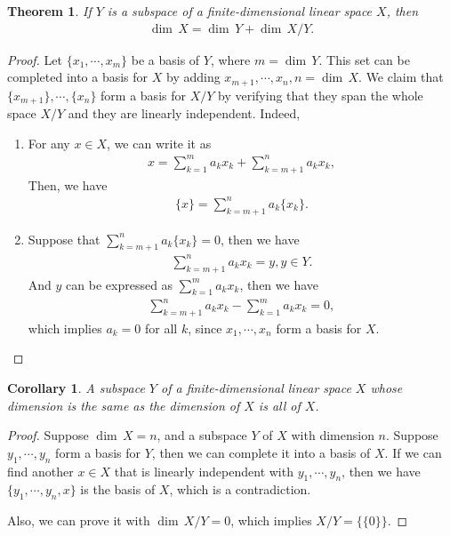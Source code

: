 \documentclass[11pt]{book}
\newtheorem{theorem}{Theorem}[chapter]
\newtheorem{corollary}{Corollary}[theorem]
\theoremstyle{definition}
\numberwithin{equation}{chapter}
\begin{document}
\medskip

\begin{theorem}\label{theorem_quotient_dim}
If $Y$ is a subspace of a finite-dimensional linear space $X$, then
\begin{align*}
     \dim \,X =  \dim \,Y +  \dim \,X/Y.
\end{align*}
\end{theorem}
\begin{proof}
Let $\{x_1, \cdots, x_m\}$ be a basis of $Y$, where $m =  \dim \,Y$. This set can be completed into a basis for $X$ by adding $x_{m+1}, \cdots, x_n, n =  \dim \,X$. We claim that $\{x_{m+1}\}, \cdots, \{x_n\}$ form a basis for $X/Y$ by  verifying that they span the whole space $X/Y$ and they are linearly independent. Indeed,
\begin{enumerate}[label=(\alph*)]
    \item For any $x\in X$, we can write it as 
    \begin{align*}
        x = \sum^m_{k=1}a_k x_k + \sum^{n}_{k=m+1}a_k x_k,
    \end{align*}
    Then, we have 
    \begin{align*}
        \{x\} = \sum^{n}_{k=m+1}a_k \{x_k\}.
    \end{align*}
    \item Suppose that $\sum^{n}_{k=m+1}a_k \{x_k\} = 0$, then we have 
    \begin{align*}
        \sum^{n}_{k=m+1}a_k x_k = y, y\in Y.
    \end{align*}
    And $y$ can be expressed as $\sum^{m}_{k=1}a_k x_k$, then we have 
    \begin{align*}
        \sum^{n}_{k=m+1}a_k x_k - \sum^{m}_{k=1}a_k x_k = 0,
    \end{align*}
    which implies $a_k = 0$ for all $k$, since $x_1, \cdots, x_n$ form a basis for $X$.
\end{enumerate}
\end{proof}


\begin{corollary}
A subspace $Y$ of a finite-dimensional linear space $X$ whose dimension is the same as the dimension of $X$ is all of $X$.
\end{corollary}
\begin{proof}
Suppose $ \dim \,X = n$, and a subspace $Y$ of $X$ with dimension $n$. Suppose $y_1,\cdots,y_n$ form a basis for $Y$, then we can complete it into a basis of $X$. If we can find another $x\in X$ that is linearly independent with $y_1,\cdots,y_n$, then we have $\{y_1,\cdots,y_n, x\}$ is the basis of $X$, which is a contradiction. 

Also, we can prove it with $ \dim \,X/Y = 0$, which implies $X/Y = \{\{0\}\}$.
\end{proof}
\end{document}
